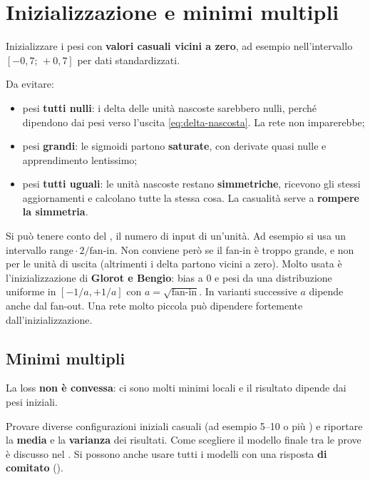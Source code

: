 \section{Inizializzazione e minimi multipli}

\begin{idea}[(!) Inizializzazione]
Inizializzare i pesi con \textbf{valori casuali vicini a zero}, ad esempio nell'intervallo $[-0{,}7;\,+0{,}7]$
per dati standardizzati.
\end{idea}

Da evitare:
\begin{itemize}
  \item pesi \textbf{tutti nulli}: i delta delle unità nascoste sarebbero nulli, perché dipendono dai pesi verso
        l'uscita \eqref{eq:delta-nascosta}. La rete non imparerebbe;
  \item pesi \textbf{grandi}: le sigmoidi partono \textbf{saturate}, con derivate quasi nulle e apprendimento
        lentissimo;
  \item pesi \textbf{tutti uguali}: le unità nascoste restano \textbf{simmetriche}, ricevono gli stessi
        aggiornamenti e calcolano tutte la stessa cosa. La casualità serve a \textbf{rompere la simmetria}.
\end{itemize}
Si può tenere conto del , il numero di input di un'unità. Ad esempio si usa un intervallo
$\text{range}\cdot2/\text{fan-in}$. Non conviene però se il fan-in è troppo grande, e non per le unità di uscita
(altrimenti i delta partono vicini a zero). Molto usata è l'inizializzazione di \textbf{Glorot e Bengio}: bias a 0
e pesi da una distribuzione uniforme in $[-1/a,+1/a]$ con $a = \sqrt{\text{fan-in}}$. In varianti successive $a$
dipende anche dal fan-out. Una rete molto piccola può dipendere fortemente dall'inizializzazione.

\subsection{Minimi multipli}

La loss \textbf{non è convessa}: ci sono molti minimi locali e il risultato dipende dai pesi iniziali.

\begin{idea}
Provare diverse configurazioni iniziali casuali (ad esempio 5--10 o più ) e riportare la
\textbf{media} e la \textbf{varianza} dei risultati. Come scegliere il modello finale tra le prove è discusso nel
. Si possono anche usare tutti i modelli con una risposta \textbf{di comitato}
().
\end{idea}

